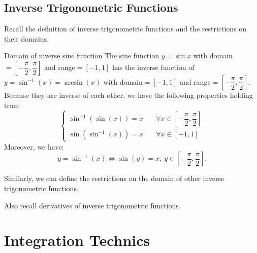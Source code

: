 \documentclass[12pt,a4paper]{article}
\begin{document}
\subsection{Inverse Trigonometric Functions}
Recall the definition of inverse trigonometric functions and the restrictions on their domains. 
\begin{thm}{Domain of inverse sine function}
	The sine function $y=\sin x$ with domain$=\left[-\dfrac{\pi}{2},\dfrac{\pi}{2}\right]$ and range$=[-1,1]$ has the inverse function of $y=\sin^{-1}(x)=\arcsin(x)$ with domain$=[-1,1]$ and range$=\left[-\dfrac{\pi}{2},\dfrac{\pi}{2}\right]$.\\
	Because they are inverse of each other, we have the following properties holding true:
	$$\begin{cases}
		\sin^{-1}(\sin(x))=x\quad&\forall x\in\left[-\dfrac{\pi}{2},\dfrac{\pi}{2}\right]\\
		\sin(\sin^{-1}(x))=x\quad&\forall x\in[-1,1]
	\end{cases}$$
	Moreover, we have: 
	$$y=\sin^{-1}(x) \Longleftrightarrow \sin(y)=x,\ y\in\left[-\dfrac{\pi}{2},\dfrac{\pi}{2}\right].$$
\end{thm}
Similarly, we can define the restrictions on the domain of other inverse trigonometric functions. 

Also recall derivatives of inverse trigonometric functions. 
\section{Integration Technics}
\end{document}
